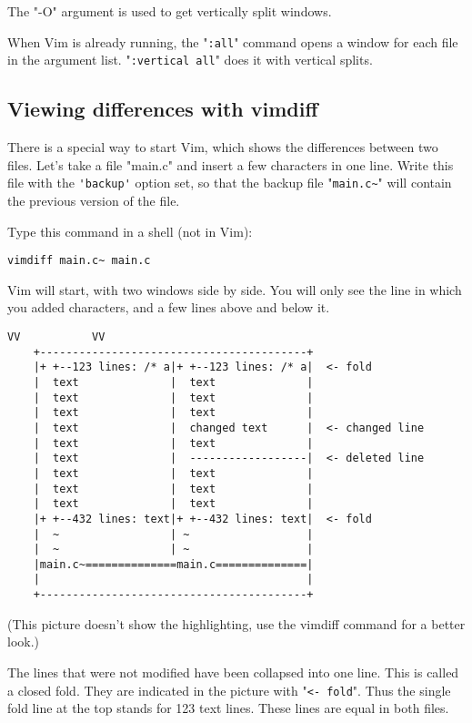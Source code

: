 The "-O" argument is used to get vertically split windows.

When Vim is already running, the "\verb!:all!" command opens a window for each file in the argument list.  "\verb!:vertical all!" does it with vertical splits.

\subsection{Viewing differences with vimdiff}
\label{Viewing differences with vimdiff}

There is a special way to start Vim, which shows the differences between two files.
Let's take a file "main.c" and insert a few characters in one line.
Write this file with the \verb!'backup'! option set, so that the backup file "\verb!main.c~!" will contain the previous version of the file.

Type this command in a shell (not in Vim):

 \begin{Verbatim}[samepage=true]
 vimdiff main.c~ main.c
 \end{Verbatim}

Vim will start, with two windows side by side.
You will only see the line in which you added characters, and a few lines above and below it.

\begin{Verbatim}[samepage=true]
     VV           VV
    +-----------------------------------------+
    |+ +--123 lines: /* a|+ +--123 lines: /* a|  <- fold
    |  text              |  text              |
    |  text              |  text              |
    |  text              |  text              |
    |  text              |  changed text      |  <- changed line
    |  text              |  text              |
    |  text              |  ------------------|  <- deleted line
    |  text              |  text              |
    |  text              |  text              |
    |  text              |  text              |
    |+ +--432 lines: text|+ +--432 lines: text|  <- fold
    |  ~                 | ~                  |
    |  ~                 | ~                  |
    |main.c~==============main.c==============|
    |                                         |
    +-----------------------------------------+
\end{Verbatim}

(This picture doesn't show the highlighting, use the vimdiff command for a better look.)

The lines that were not modified have been collapsed into one line.
This is called a closed fold.
They are indicated in the picture with "\verb!<- fold!".
Thus the single fold line at the top stands for 123 text lines.
These lines are equal in both files.

